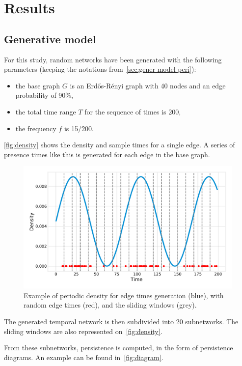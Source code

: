 \documentclass[a4paper,11pt,openany,extrafontsizes]{memoir}
\begin{document}
\section{Results}%
\label{sec:results}

\subsection{Generative model}%
\label{sec:generative-model}

For this study, random networks have been generated with the following
parameters (keeping the notations
from~\autoref{sec:gener-model-peri}):
\begin{itemize}
\item the base graph $G$ is an Erdős-Rényi graph with 40 nodes and an
  edge probability of 90\%,
\item the total time range $T$ for the sequence of times is 200,
\item the frequency $f$ is 15/200.
\end{itemize}

\autoref{fig:density} shows the density and sample times for a single
edge. A series of presence times like this is generated for each edge
in the base graph.

\begin{figure}[ht]
  \centering
  \includegraphics[width=.85\linewidth]{fig/density.pdf}
  \caption[Example of periodic density for edge times
  generation.]{Example of periodic density for edge times generation
    (blue), with random edge times (red), and the sliding windows
    (grey).}%
  \label{fig:density}
\end{figure}

The generated temporal network is then subdivided into 20
subnetworks. The sliding windows are also represented
on~\autoref{fig:density}.

From these subnetworks, persistence is computed, in the form of
persistence diagrams. An example can be found
in~\autoref{fig:diagram}.
\end{document}
